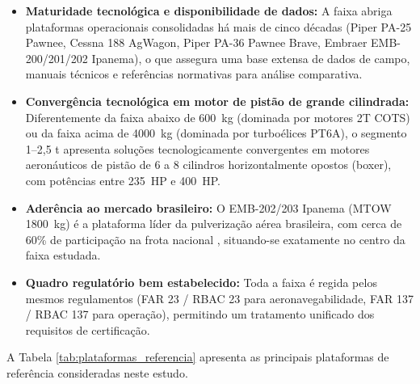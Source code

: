 \documentclass[a4paper,12pt]{article}
\begin{document}
\begin{itemize}
    \item \textbf{Maturidade tecnológica e disponibilidade de dados:} A faixa abriga plataformas operacionais consolidadas há mais de cinco décadas (Piper PA-25 Pawnee, Cessna 188 AgWagon, Piper PA-36 Pawnee Brave, Embraer EMB-200/201/202 Ipanema), o que assegura uma base extensa de dados de campo, manuais técnicos e referências normativas para análise comparativa.
    \item \textbf{Convergência tecnológica em motor de pistão de grande cilindrada:} Diferentemente da faixa abaixo de \SI{600}{kg} (dominada por motores 2T COTS) ou da faixa acima de \SI{4000}{kg} (dominada por turboélices PT6A), o segmento 1--2{,}5 t apresenta soluções tecnologicamente convergentes em motores aeronáuticos de pistão de 6 a 8 cilindros horizontalmente opostos (boxer), com potências entre \SI{235}{HP} e \SI{400}{HP}.
    \item \textbf{Aderência ao mercado brasileiro:} O EMB-202/203 Ipanema (MTOW \SI{1800}{kg}) é a plataforma líder da pulverização aérea brasileira, com cerca de 60\% de participação na frota nacional \cite{embraer_1700}, situando-se exatamente no centro da faixa estudada. %
    \item \textbf{Quadro regulatório bem estabelecido:} Toda a faixa é regida pelos mesmos regulamentos (FAR 23 / RBAC 23 para aeronavegabilidade, FAR 137 / RBAC 137 para operação), permitindo um tratamento unificado dos requisitos de certificação.
\end{itemize}

A Tabela \ref{tab:plataformas_referencia} apresenta as principais plataformas de referência consideradas neste estudo.
\end{document}
